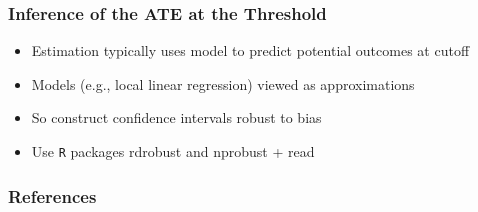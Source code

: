 \documentclass[table, xcolor = {dvipsnames}, 9pt]{beamer}
\theoremstyle{plain}
\begin{document}
\begin{frame}
\frametitle{Inference of the ATE at the Threshold}
\vfill
\begin{itemize} \vfill
\item Estimation typically uses model to predict potential outcomes at cutoff \vfill
\item Models (e.g., local linear regression) viewed as approximations \vfill
\item So construct confidence intervals robust to bias \citep[see][]{calonicoetal2014} \vfill
\item Use \texttt{R} packages \textrm{rdrobust} and \textrm{nprobust} + read \citet{calonicoetal2019} \vfill
\end{itemize} \vfill
\end{frame}
\begin{frame}[allowframebreaks]
\frametitle{References} 
\scriptsize

\end{frame}
\end{document}
